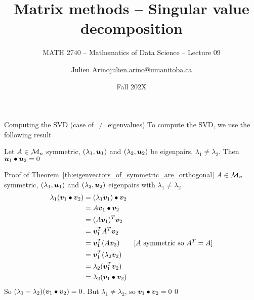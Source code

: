 \documentclass[aspectratio=169]{beamer}\usepackage[]{graphicx}\usepackage[]{xcolor}
\subtitle{MATH 2740 -- Mathematics of Data Science -- Lecture 09}
\author{\texorpdfstring{Julien Arino\newline\url{julien.arino@umanitoba.ca}}{Julien Arino}}
\institute{Department of Mathematics @ University of Manitoba}
\date{Fall 202X}
\title{Matrix methods -- Singular value decomposition}
\begin{document}

\setcounter{theorem}{6}  %






\begin{frame}{Computing the SVD (case of $\neq$ eigenvalues)}
To compute the SVD, we use the following result
\vfill
\begin{theorem}\label{th:eigenvectors_of_symmetric_are_orthogonal}
Let $A\in\mathcal{M}_n$ symmetric, $(\lambda_1,\bm{u}_1)$ and $(\lambda_2,\bm{u}_2)$ be eigenpairs, $\lambda_1\neq\lambda_2$. Then $\bm{u}_1\bullet\bm{u}_2=0$
\end{theorem}
\end{frame}

\begin{frame}{Proof of Theorem~\ref{th:eigenvectors_of_symmetric_are_orthogonal}}
$A\in\mathcal{M}_n$ symmetric, $(\lambda_1,\bm{u}_1)$ and $(\lambda_2,\bm{u}_2)$ eigenpairs with $\lambda_1\neq\lambda_2$
\begin{align*}
\lambda_1(\bm{v}_1\bullet\bm{v}_2) 
&= (\lambda_1\bm{v}_1)\bullet\bm{v}_2 \\
&= A\bm{v}_1\bullet\bm{v}_2 \\
&= (A\bm{v}_1)^T\bm{v}_2 \\
&= \bm{v}_1^TA^T\bm{v}_2 \\
&= \bm{v}_1^T(A\bm{v}_2)  \qquad\textrm{[$A$ symmetric so $A^T=A$]} \\
&= \bm{v}_1^T(\lambda_2\bm{v}_2) \\
&= \lambda_2(\bm{v}_1^T\bm{v}_2) \\
&= \lambda_2(\bm{v}_1\bullet\bm{v}_2)
\end{align*}
\vfill
So $(\lambda_1-\lambda_2)(\bm{v}_1\bullet\bm{v}_2)=0$. But $\lambda_1\neq\lambda_2$, so $\bm{v}_1\bullet\bm{v}_2=0$\hfill\qed
\end{frame}
\end{document}
